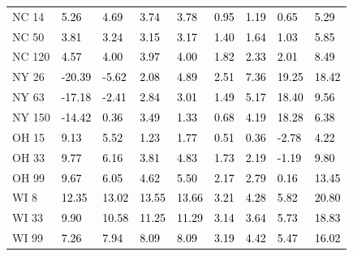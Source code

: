 \begin{tabular}{lllllllll}
NC 14 & \textcolor{black}{ 5.26 } & \textcolor{black}{ 4.69 } & \textcolor{black}{ 3.74 } & \textcolor{black}{ 3.78 } & \textcolor{black}{ 0.95 } & \textcolor{black}{ 1.19 } & \textcolor{black}{ 0.65 } & \textcolor{black}{ 5.29 } \\
NC 50 & \textcolor{black}{ 3.81 } & \textcolor{black}{ 3.24 } & \textcolor{black}{ 3.15 } & \textcolor{black}{ 3.17 } & \textcolor{black}{ 1.40 } & \textcolor{black}{ 1.64 } & \textcolor{black}{ 1.03 } & \textcolor{black}{ 5.85 } \\
NC 120 & \textcolor{black}{ 4.57 } & \textcolor{black}{ 4.00 } & \textcolor{black}{ 3.97 } & \textcolor{black}{ 4.00 } & \textcolor{black}{ 1.82 } & \textcolor{black}{ 2.33 } & \textcolor{black}{ 2.01 } & \textcolor{black}{ 8.49 } \\
NY 26 & \textcolor{black}{ -20.39 } & \textcolor{black}{ -5.62 } & \textcolor{black}{ 2.08 } & \textcolor{black}{ 4.89 } & \textcolor{black}{ 2.51 } & \textcolor{black}{ 7.36 } & \textcolor{black}{ 19.25 } & \textcolor{black}{ 18.42 } \\
NY 63 & \textcolor{black}{ -17.18 } & \textcolor{black}{ -2.41 } & \textcolor{black}{ 2.84 } & \textcolor{black}{ 3.01 } & \textcolor{black}{ 1.49 } & \textcolor{black}{ 5.17 } & \textcolor{black}{ 18.40 } & \textcolor{black}{ 9.56 } \\
NY 150 & \textcolor{black}{ -14.42 } & \textcolor{black}{ 0.36 } & \textcolor{black}{ 3.49 } & \textcolor{black}{ 1.33 } & \textcolor{black}{ 0.68 } & \textcolor{black}{ 4.19 } & \textcolor{black}{ 18.28 } & \textcolor{black}{ 6.38 } \\
OH 15 & \textcolor{black}{ 9.13 } & \textcolor{black}{ 5.52 } & \textcolor{black}{ 1.23 } & \textcolor{black}{ 1.77 } & \textcolor{black}{ 0.51 } & \textcolor{black}{ 0.36 } & \textcolor{black}{ -2.78 } & \textcolor{black}{ 4.22 } \\
OH 33 & \textcolor{black}{ 9.77 } & \textcolor{black}{ 6.16 } & \textcolor{black}{ 3.81 } & \textcolor{black}{ 4.83 } & \textcolor{black}{ 1.73 } & \textcolor{black}{ 2.19 } & \textcolor{black}{ -1.19 } & \textcolor{black}{ 9.80 } \\
OH 99 & \textcolor{black}{ 9.67 } & \textcolor{black}{ 6.05 } & \textcolor{black}{ 4.62 } & \textcolor{black}{ 5.50 } & \textcolor{black}{ 2.17 } & \textcolor{black}{ 2.79 } & \textcolor{black}{ 0.16 } & \textcolor{black}{ 13.45 } \\
WI 8 & \textcolor{black}{ 12.35 } & \textcolor{black}{ 13.02 } & \textcolor{black}{ 13.55 } & \textcolor{black}{ 13.66 } & \textcolor{black}{ 3.21 } & \textcolor{black}{ 4.28 } & \textcolor{black}{ 5.82 } & \textcolor{black}{ 20.80 } \\
WI 33 & \textcolor{black}{ 9.90 } & \textcolor{black}{ 10.58 } & \textcolor{black}{ 11.25 } & \textcolor{black}{ 11.29 } & \textcolor{black}{ 3.14 } & \textcolor{black}{ 3.64 } & \textcolor{black}{ 5.73 } & \textcolor{black}{ 18.83 } \\
WI 99 & \textcolor{black}{ 7.26 } & \textcolor{black}{ 7.94 } & \textcolor{black}{ 8.09 } & \textcolor{black}{ 8.09 } & \textcolor{black}{ 3.19 } & \textcolor{black}{ 4.42 } & \textcolor{black}{ 5.47 } & \textcolor{black}{ 16.02 } \\
\bottomrule
\end{tabular}
